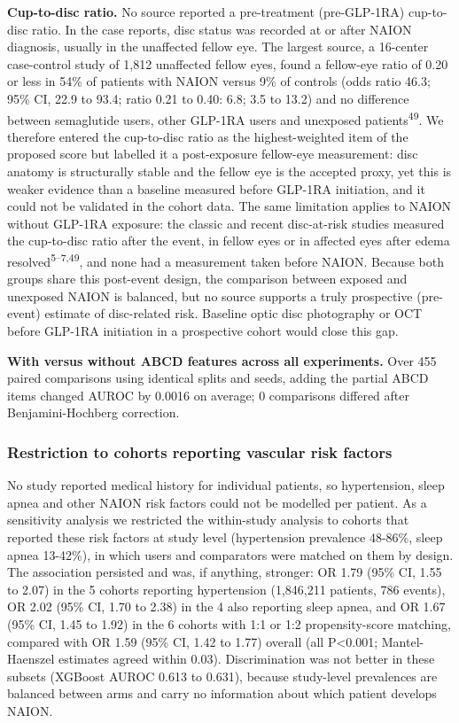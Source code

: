 \documentclass[
  11pt,
]{article}
\begin{document}
\textbf{Cup-to-disc ratio.} No source reported a pre-treatment
(pre-GLP-1RA) cup-to-disc ratio. In the case reports, disc status was
recorded at or after NAION diagnosis, usually in the unaffected fellow
eye. The largest source, a 16-center case-control study of 1,812
unaffected fellow eyes, found a fellow-eye ratio of 0.20 or less in 54\%
of patients with NAION versus 9\% of controls (odds ratio 46.3; 95\% CI,
22.9 to 93.4; ratio 0.21 to 0.40: 6.8; 3.5 to 13.2) and no difference
between semaglutide users, other GLP-1RA users and unexposed
patients\textsuperscript{49}. We therefore entered the cup-to-disc ratio
as the highest-weighted item of the proposed score but labelled it a
post-exposure fellow-eye measurement: disc anatomy is structurally
stable and the fellow eye is the accepted proxy, yet this is weaker
evidence than a baseline measured before GLP-1RA initiation, and it
could not be validated in the cohort data. The same limitation applies
to NAION without GLP-1RA exposure: the classic and recent disc-at-risk
studies measured the cup-to-disc ratio after the event, in fellow eyes
or in affected eyes after edema resolved\textsuperscript{5--7,49}, and
none had a measurement taken before NAION. Because both groups share
this post-event design, the comparison between exposed and unexposed
NAION is balanced, but no source supports a truly prospective
(pre-event) estimate of disc-related risk. Baseline optic disc
photography or OCT before GLP-1RA initiation in a prospective cohort
would close this gap.

\textbf{With versus without ABCD features across all experiments.} Over
455 paired comparisons using identical splits and seeds, adding the
partial ABCD items changed AUROC by 0.0016 on average; 0 comparisons
differed after Benjamini-Hochberg correction.

\subsubsection{Restriction to cohorts reporting vascular risk
factors}\label{restriction-to-cohorts-reporting-vascular-risk-factors}

No study reported medical history for individual patients, so
hypertension, sleep apnea and other NAION risk factors could not be
modelled per patient. As a sensitivity analysis we restricted the
within-study analysis to cohorts that reported these risk factors at
study level (hypertension prevalence 48-86\%, sleep apnea 13-42\%), in
which users and comparators were matched on them by design. The
association persisted and was, if anything, stronger: OR 1.79 (95\% CI,
1.55 to 2.07) in the 5 cohorts reporting hypertension (1,846,211
patients, 786 events), OR 2.02 (95\% CI, 1.70 to 2.38) in the 4 also
reporting sleep apnea, and OR 1.67 (95\% CI, 1.45 to 1.92) in the 6
cohorts with 1:1 or 1:2 propensity-score matching, compared with OR 1.59
(95\% CI, 1.42 to 1.77) overall (all P\textless0.001; Mantel-Haenszel
estimates agreed within 0.03). Discrimination was not better in these
subsets (XGBoost AUROC 0.613 to 0.631), because study-level prevalences
are balanced between arms and carry no information about which patient
develops NAION.
\end{document}

